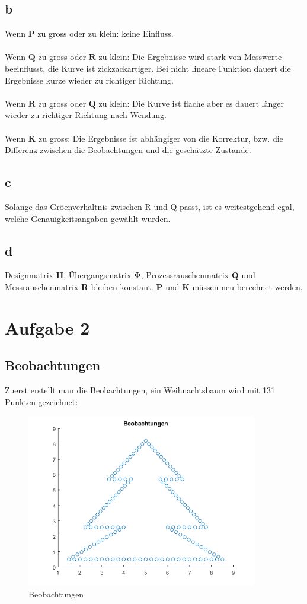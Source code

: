\subsection{b}
Wenn $\bm{P}$ zu gross oder zu klein: keine Einfluss. \\\\
Wenn $\bm{Q}$ zu gross oder $\bm{R}$ zu klein: Die Ergebnisse wird stark von Messwerte beeinflusst, die Kurve ist zickzackartiger. Bei nicht lineare Funktion dauert die Ergebnisse kurze wieder zu richtiger Richtung.\\\\
Wenn $\bm{R}$ zu gross oder $\bm{Q}$ zu klein: Die Kurve ist flache aber es dauert länger wieder zu richtiger Richtung nach Wendung.\\\\
Wenn $\bm{K}$ zu gross: Die Ergebnisse ist abhängiger von die Korrektur, bzw. die Differenz zwischen die Beobachtungen und die geschätzte Zustande. 
\subsection{c}
Solange das Gröenverhältnis zwischen R und Q passt, ist es weitestgehend egal, welche
Genauigkeitsangaben gewählt wurden. 
\subsection{d}
Designmatrix $\bm{H}$, Übergangsmatrix $\bm{\Phi}$, Prozessrauschenmatrix $\bm{Q}$ und Messrauschenmatrix $\bm{R}$ bleiben konstant. $\bm{P}$ und $\bm{K}$ müssen neu berechnet werden. 
\clearpage
\section{Aufgabe 2}
\subsection{Beobachtungen}
Zuerst erstellt man die Beobachtungen, ein Weihnachtsbaum wird mit 131 Punkten gezeichnet:
\begin{figure}[htbp]
	\centering
	\includegraphics[width=0.9\textwidth]{images/Beobachtung} 
	\caption{Beobachtungen} 
	\label{fig:beobachtung}
\end{figure}
